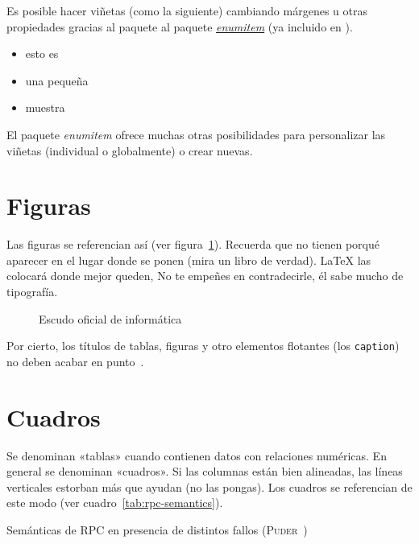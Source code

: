 Es posible hacer viñetas (como la siguiente) cambiando márgenes u otras
propiedades gracias al paquete al paquete
\href{http://mirror.ctan.org/macros/latex/contrib/enumitem/enumitem.pdf}{\emph{enumitem}}
(ya incluido en \arcopfc).

\begin{itemize}[noitemsep, label=$\triangleright$]
\item esto es
\item una pequeña
\item muestra
\end{itemize}

El paquete \emph{enumitem} ofrece muchas otras posibilidades para personalizar
las viñetas (individual o globalmente) o crear nuevas.


\section{Figuras}

Las figuras se referencian así (ver figura~\ref{fig:informatica}). Recuerda que
no tienen porqué aparecer en el lugar donde se ponen (mira un libro de
verdad). \LaTeX{} las colocará donde mejor queden, No te empeñes en
contradecirle, él sabe mucho de tipografía.

\begin{figure}[!h]
\begin{center}
\caption{Escudo oficial de informática}
\label{fig:informatica}
\end{center}
\end{figure}

Por cierto, los títulos de tablas, figuras y otro elementos flotantes (los
\texttt{caption}) no deben acabar en punto~\cite{sousa}.


\section{Cuadros}
\label{sec:uncuadro}

Se denominan «tablas» cuando contienen datos con relaciones numéricas. En
general se denominan «cuadros». Si las columnas están bien alineadas, las líneas
verticales estorban más que ayudan (no las pongas). Los cuadros se referencian
de este modo (ver cuadro~\ref{tab:rpc-semantics}).

\begin{table}[htbp]
  \centering
  {\small
  
  }
  \caption[Semánticas de \acs{RPC} en presencia de distintos fallos]
  {Semánticas de \acs{RPC} en presencia de distintos fallos
    (\textsc{Puder}~\cite{puder05:_distr_system_archit})}
  \label{tab:rpc-semantics}
\end{table}


